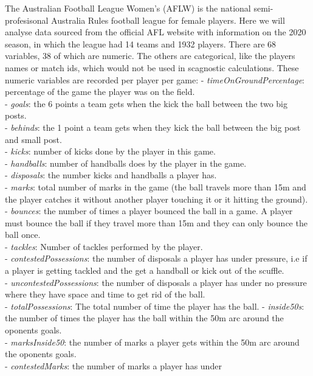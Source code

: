 The Australian Football League Women's (AFLW) is the national
semi-profesisonal Australia Rules football league for female players.
Here we will analyse data sourced from the official AFL website with
information on the 2020 season, in which the league had 14 teams and
1932 players. There are 68 variables, 38 of which are numeric. The
others are categorical, like the players names or match ids, which would
not be used in scagnostic calculations. These numeric variables are
recorded per player per game: - \emph{timeOnGroundPercentage}:
percentage of the game the player was on the field.\\
- \emph{goals}: the 6 points a team gets when the kick the ball between
the two big posts.\\
- \emph{behinds}: the 1 point a team gets when they kick the ball
between the big post and small post.\\
- \emph{kicks}: number of kicks done by the player in this game.\\
- \emph{handballs}: number of handballs does by the player in the
game.\\
- \emph{disposals}: the number kicks and handballs a player has.\\
- \emph{marks}: total number of marks in the game (the ball travels more
than 15m and the player catches it without another player touching it or
it hitting the ground).\\
- \emph{bounces}: the number of times a player bounced the ball in a
game. A player must bounce the ball if they travel more than 15m and
they can only bounce the ball once.\\
- \emph{tackles}: Number of tackles performed by the player.\\
- \emph{contestedPossessions}: the number of disposals a player has
under pressure, i.e if a player is getting tackled and the get a
handball or kick out of the scuffle.\\
- \emph{uncontestedPossessions}: the number of disposals a player has
under no pressure where they have space and time to get rid of the
ball.\\
- \emph{totalPossessions}: The total number of time the player has the
ball. - \emph{inside50s}: the number of times the player has the ball
within the 50m arc around the oponents goals.\\
- \emph{marksInside50}: the number of marks a player gets within the 50m
arc around the oponents goals.\\
- \emph{contestedMarks}: the number of marks a player has under
